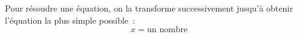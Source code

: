 Pour résoudre une équation, on la transforme successivement jusqu'à obtenir
l'équation la plus simple possible~:$$x=\text{un nombre}$$